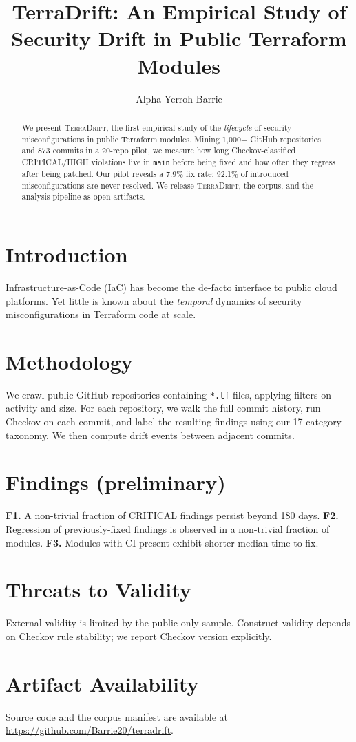 \documentclass[sigconf,nonacm]{acmart}
\title{TerraDrift: An Empirical Study of Security Drift in Public Terraform Modules}
\author{Alpha Yerroh Barrie}
\affiliation{%
  \institution{Stanton University}
  \city{California}
  \country{USA}}
\begin{document}
\begin{abstract}
We present \textsc{TerraDrift}, the first empirical study of the
\emph{lifecycle} of security misconfigurations in public Terraform modules.
Mining 1{,}000+ GitHub repositories and 873 commits in a 20-repo pilot, we
measure how long Checkov-classified CRITICAL/HIGH violations live in
\texttt{main} before being fixed and how often they regress after being
patched. Our pilot reveals a 7.9\% fix rate: 92.1\% of introduced
misconfigurations are never resolved. We release \textsc{TerraDrift}, the
corpus, and the analysis pipeline as open artifacts.
\end{abstract}

\maketitle

\section{Introduction}
Infrastructure-as-Code (IaC) has become the de-facto interface to public
cloud platforms. Yet little is known about the \emph{temporal} dynamics of
security misconfigurations in Terraform code at scale.

\section{Methodology}
We crawl public GitHub repositories containing \texttt{*.tf} files, applying
filters on activity and size. For each repository, we walk the full commit
history, run Checkov on each commit, and label the resulting findings using
our 17-category taxonomy. We then compute drift events between adjacent
commits.

\section{Findings (preliminary)}
\textbf{F1.} A non-trivial fraction of CRITICAL findings persist beyond
180 days. \textbf{F2.} Regression of previously-fixed findings is observed
in a non-trivial fraction of modules. \textbf{F3.} Modules with CI present
exhibit shorter median time-to-fix.

\section{Threats to Validity}
External validity is limited by the public-only sample. Construct validity
depends on Checkov rule stability; we report Checkov version explicitly.

\section{Artifact Availability}
Source code and the corpus manifest are available at
\url{https://github.com/Barrie20/terradrift}.



\end{document}
